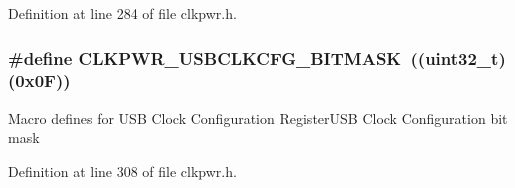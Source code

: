 Definition at line 284 of file clkpwr.\+h.

\subsubsection[{\texorpdfstring{C\+L\+K\+P\+W\+R\+\_\+\+U\+S\+B\+C\+L\+K\+C\+F\+G\+\_\+\+B\+I\+T\+M\+A\+SK}{CLKPWR_USBCLKCFG_BITMASK}}]{\setlength{\rightskip}{0pt plus 5cm}\#define C\+L\+K\+P\+W\+R\+\_\+\+U\+S\+B\+C\+L\+K\+C\+F\+G\+\_\+\+B\+I\+T\+M\+A\+SK~(({\bf uint32\+\_\+t})(0x0\+F))}\hypertarget{group___c_l_k_p_w_r___private___macros_ga12d7d89e728855b19604a2269defe745}{}\label{group___c_l_k_p_w_r___private___macros_ga12d7d89e728855b19604a2269defe745}
Macro defines for U\+SB Clock Configuration Register\+U\+SB Clock Configuration bit mask 

Definition at line 308 of file clkpwr.\+h.


